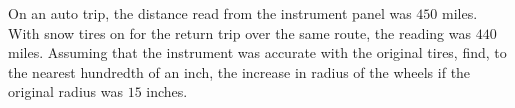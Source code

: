 On an auto trip, the distance read from the instrument panel was $450$ miles. With snow tires on for the return trip over the same route, the reading was $440$ miles. Assuming that the instrument was accurate with the original tires, find, to the nearest hundredth of an inch, the increase in radius of the wheels if the original radius was $15$ inches.
